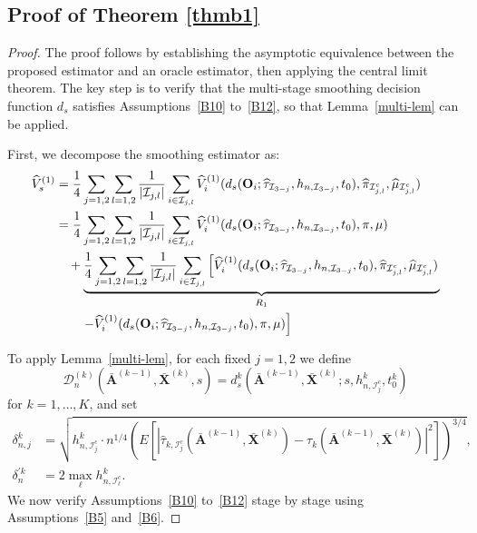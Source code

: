 \documentclass[11pt]{article}
\theoremstyle{referenceplain}
\theoremstyle{referencedefinition}
\theoremstyle{referenceremark}
\begin{document}
\subsection{Proof of Theorem \ref{thmb1}}
\begin{proof}
The proof follows by establishing the asymptotic equivalence between the proposed estimator and an oracle estimator, then applying the central limit theorem. The key step is to verify that the multi-stage smoothing decision function $d_s$ satisfies Assumptions~\ref{B10} to~\ref{B12}, so that Lemma~\ref{multi-lem} can be applied.

First, we decompose the smoothing estimator as:
\begin{align}
    \widehat{V}_{s}^{(1)} &= \frac{1}{4}\sum_{j=1,2}\sum_{l=1,2}\frac{1}{|\mathcal{I}_{j,l}|}\sum_{i\in\mathcal{I}_{j,l}}\widehat{V}_i^{(1)}(d_{s}(\mathbf{O}_i;\widehat{\tau}_{\mathcal{I}_{3-j}},h_{n,\mathcal{I}_{3-j}},t_0),\widehat{\pi}_{\mathcal{I}_{j,l}^c},\widehat{\mu}_{\mathcal{I}_{j,l}^c})\label{multi-decomp-1}\\
    &= \frac{1}{4}\sum_{j=1,2}\sum_{l=1,2}\frac{1}{|\mathcal{I}_{j,l}|}\sum_{i\in\mathcal{I}_{j,l}}\widehat{V}_i^{(1)}(d_{s}(\mathbf{O}_i;\widehat{\tau}_{\mathcal{I}_{3-j}},h_{n,\mathcal{I}_{3-j}},t_0),\pi,\mu)\label{multi-decomp-2}\\
    &\quad + \underbrace{\frac{1}{4}\sum_{j=1,2}\sum_{l=1,2}\frac{1}{|\mathcal{I}_{j,l}|}\sum_{i\in\mathcal{I}_{j,l}}\left[\widehat{V}_i^{(1)}(d_{s}(\mathbf{O}_i;\widehat{\tau}_{\mathcal{I}_{3-j}},h_{n,\mathcal{I}_{3-j}},t_0),\widehat{\pi}_{\mathcal{I}_{j,l}^c},\widehat{\mu}_{\mathcal{I}_{j,l}^c})\right.}_{R_1}\notag\\
    &\quad\quad\left. - \widehat{V}_i^{(1)}(d_{s}(\mathbf{O}_i;\widehat{\tau}_{\mathcal{I}_{3-j}},h_{n,\mathcal{I}_{3-j}},t_0),\pi,\mu)\right]\notag
\end{align}

To apply Lemma~\ref{multi-lem}, {for each fixed $j=1,2$} we define 
\[
\mathcal{D}_n^{(k)}(\bar{\mathbf{A}}^{(k-1)},\bar{\mathbf{X}}^{(k)},s)
=d_s^k(\bar{\mathbf{A}}^{(k-1)},\bar{\mathbf{X}}^{(k)};
s,h_{n,\mathcal{I}_{j}^c}^k,t_0^k)
\]
for $k=1,\dots,K$, 
and set
\begin{align*}
    {\delta_{n,j}^k} &= \sqrt{h_{n,\mathcal{I}_j^c}^k 
    \cdot n^{1/4}\left(E\!\left[|\widehat{\tau}_{k,\mathcal{I}_j^c}
    (\bar{\mathbf{A}}^{(k-1)},\bar{\mathbf{X}}^{(k)})
    -\tau_k(\bar{\mathbf{A}}^{(k-1)},\bar{\mathbf{X}}^{(k)})|^2
    \right]\right)^{3/4}},\\
    \delta_n^{\prime k} &= 2\max_{{\ell}} h_{n,\mathcal{I}_{{\ell}}^c}^k.
\end{align*}
We now verify Assumptions~\ref{B10} to~\ref{B12} stage by stage using Assumptions~\ref{B5} and~\ref{B6}.


\end{proof}
\end{document}
